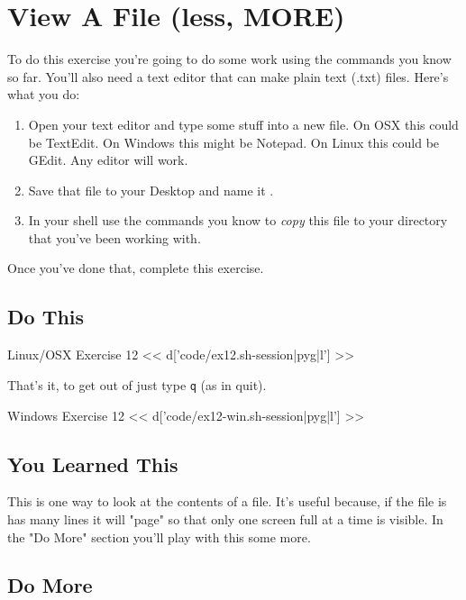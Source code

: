 \chapter{View A File (less, MORE)}

To do this exercise you're going to do some work using the commands you know so far.
You'll also need a text editor that can make plain text (.txt) files.  Here's
what you do:

\begin{enumerate}
\item Open your text editor and type some stuff into a new file. On OSX this could be TextEdit.  On Windows this might be Notepad.  On Linux this could be GEdit.  Any editor will work.
\item Save that file to your Desktop and name it .
\item In your shell use the commands you know to \emph{copy} this file
    to your  directory that you've been working with.
\end{enumerate}

Once you've done that, complete this exercise.

\section{Do This}

\begin{code}{Linux/OSX Exercise 12}
<< d['code/ex12.sh-session|pyg|l'] >>
\end{code}

That's it, to get out of  just type \verb|q| (as in quit).

\begin{code}{Windows Exercise 12}
<< d['code/ex12-win.sh-session|pyg|l'] >>
\end{code}

\section{You Learned This}

This is one way to look at the contents of a file.  It's useful because, if the
file is has many lines it will "page" so that only one screen full at a time
is visible.  In the "Do More" section you'll play with this some more.


\section{Do More}

